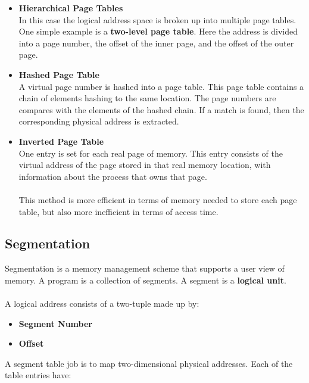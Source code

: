 \documentclass{article}
\begin{document}
\begin{itemize}
	\item \textbf{Hierarchical Page Tables}
	\vspace{.2cm} \\
	In this case the logical address space is broken up into multiple page tables. One simple example is a \textbf{two-level page table}. Here the address is divided into a page number, the offset of the inner page, and the offset of the outer page.
	
	\item \textbf{Hashed Page Table}
	\vspace{.2cm} \\
	A virtual page number is hashed into a page table. This page table contains a chain of elements hashing to the same location. The page numbers are compares with the elements of the hashed chain. If a match is found, then the corresponding physical address is extracted.
	
	\item \textbf{Inverted Page Table}
	\vspace{.2cm} \\
	One entry is set for each real page of memory. This entry consists of the virtual address of the page stored in that real memory location, with information about the process that owns that page. \\ \\
	This method is more efficient in terms of memory needed to store each page table, but also more inefficient in terms of access time.
\end{itemize}

\subsection{Segmentation}
Segmentation is a memory management scheme that supports a user view of memory. A program is a collection of segments. A segment is a \textbf{logical unit}. \\ \\
A logical address consists of a two-tuple made up by:

\begin{itemize}
	\item \textbf{Segment Number}
	\item \textbf{Offset}
\end{itemize}
A segment table job is to map two-dimensional physical addresses. Each of the table entries have:
\end{document}
